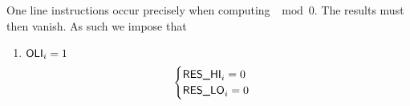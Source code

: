 One line instructions occur precisely when computing $\mod 0$. The results must then vanish. 
As such we impose that
\begin{enumerate}
	\item \If $\textsf{OLI}_{i} = 1$ \Then 
		\[
			\begin{cases}
				\textsf{RES}\textsf{\_HI}_{i} = 0 \\
				\textsf{RES}\textsf{\_LO}_{i} = 0 \\
			\end{cases}
		\]
\end{enumerate}

